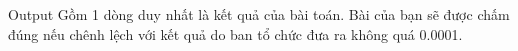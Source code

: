 Output
Gồm 1 dòng duy nhất là kết quả của bài toán. Bài của bạn sẽ được chấm đúng nếu chênh lệch với kết quả do ban tổ chức đưa ra không quá 0.0001.